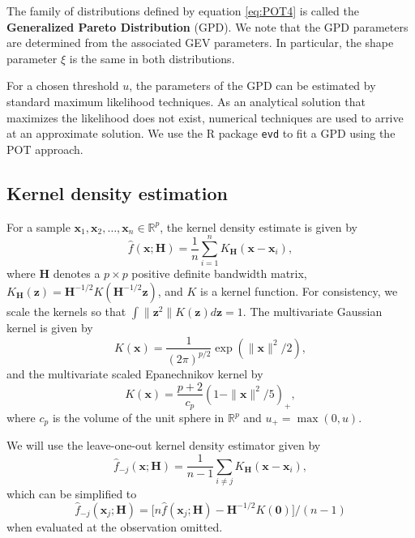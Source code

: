 \documentclass[11pt,a4paper,]{article}
\theoremstyle{definition}
\theoremstyle{definition}
\theoremstyle{definition}
\theoremstyle{remark}
\begin{document}
The family of distributions defined by equation \eqref{eq:POT4} is called the \textbf{Generalized Pareto Distribution} (GPD). We note that the GPD parameters are determined from the associated GEV parameters. In particular, the shape parameter \(\xi\) is the same in both distributions.

For a chosen threshold \(u\), the parameters of the GPD can be estimated by standard maximum likelihood techniques. As an analytical solution that maximizes the likelihood does not exist, numerical techniques are used to arrive at an approximate solution. We use the R package \texttt{evd} to fit a GPD using the POT approach.

\hypertarget{subsec:kde}{%
\subsection{Kernel density estimation}\label{subsec:kde}}

For a sample \(\bm{x}_1, \bm{x}_2, \dots, \bm{x}_n \in \mathbb{R}^p\), the kernel density estimate is given by
\begin{equation}\label{eq:kde6}
  \hat{f}(\bm{x}; \bm{H}) = \frac{1}{n} \sum_{i=1}^n K_{\bm{H}}\left(\bm{x} -\bm{x}_i \right) ,
\end{equation}
where \(\bm{H}\) denotes a \(p \times p\) positive definite bandwidth matrix, \(K_{\bm{H}}(\bm{z}) = \bm{H}^{-1/2} K(\bm{H}^{-1/2} \bm{z})\), and \(K\) is a kernel function.
For consistency, we scale the kernels so that \(\int \|\bm{z}^2\| K(\bm{z}) d\bm{z} = 1\). The multivariate Gaussian kernel is given by
\begin{equation}\label{eq:kde7}
  K(\bm{x}) = \frac{1}{(2\pi)^{p/2}} \exp( \| \bm{x} \| ^2/2) ,
\end{equation}
and the multivariate scaled Epanechnikov kernel by
\begin{equation}\label{eq:kde8}
  K(\bm{x}) = \frac{p+2}{c_p}(1 - \| \bm{x} \| ^2 / 5)_+  ,
\end{equation}
where \(c_p\) is the volume of the unit sphere in \(\mathbb{R}^p\) and \(u_+ = \max(0,u)\).

We will use the leave-one-out kernel density estimator given by
\begin{equation}\label{eq:kde9}
    \hat{f}_{-j}(\bm{x};\bm{H}) = \frac{1}{n-1}\sum_{i \neq j} K_{\bm{H}}(\bm{x}-\bm{x}_i),
\end{equation}
which can be simplified to
\begin{equation}\label{eq:kde9b}
  \hat{f}_{-j}(\bm{x}_j;\bm{H}) = \big[n\hat{f}(\bm{x}_j;\bm{H}) - \bm{H}^{-1/2}K(\bm{0})\big]/(n-1)
\end{equation}
when evaluated at the observation omitted.
\end{document}

